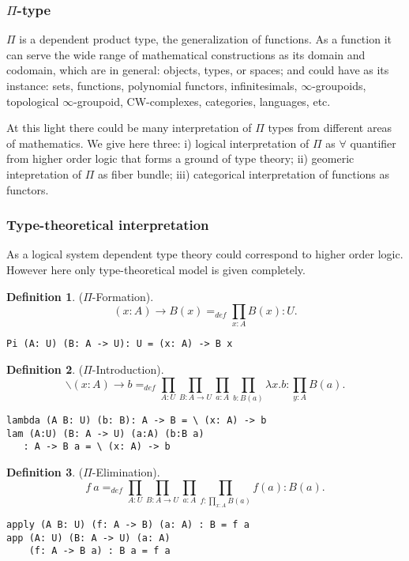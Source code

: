 \documentclass{article}
\theoremstyle{definition}
\newtheorem{definition}{Definition}
\begin{document}
\subsubsection{$\Pi$-type}

$\Pi$ is a dependent product type, the generalization of functions.
As a function it can serve the wide range of mathematical constructions as its domain and codomain,
which are in general: objects, types, or spaces; and could have as its
instance: sets, functions, polynomial functors, infinitesimals, $\infty$-groupoids,
topological $\infty$-groupoid, CW-complexes,
categories, languages, etc.

At this light there could be many interpretation of $\Pi$ types from different
areas of mathematics. We give here three: i) logical interpretation of $\Pi$ as
$\forall$ quantifier from higher order logic
that forms a ground of type theory; ii) geomeric intepretation of $\Pi$ as fiber bundle;
iii) categorical interpretation of functions as functors.

\subsubsection*{Type-theoretical interpretation}

As a logical system dependent type theory could correspond to higher order logic.
However here only type-theoretical model is given completely.

\begin{definition} ($\Pi$-Formation).
$$(x: A) \rightarrow B(x) =_{def} \prod_{x:A}B(x) : U.$$
\begin{lstlisting}
Pi (A: U) (B: A -> U): U = (x: A) -> B x
\end{lstlisting}
\end{definition}

\begin{definition} ($\Pi$-Introduction).
$$\backslash (x: A) \rightarrow b =_{def} \prod_{A:U}\prod_{B:A \rightarrow U}\prod_{a: A}\prod_{b:B(a)}\lambda x.b : \prod_{y:A}B(a).$$
\begin{lstlisting}
lambda (A B: U) (b: B): A -> B = \ (x: A) -> b
lam (A:U) (B: A -> U) (a:A) (b:B a)
   : A -> B a = \ (x: A) -> b
\end{lstlisting}
\end{definition}

\begin{definition} ($\Pi$-Elimination).
$$f\ a =_{def} \prod_{A:U}\prod_{B: A \rightarrow U}\prod_{a:A}\prod_{f: \prod_{x:A}B(a)}f(a) : B(a).$$
\begin{lstlisting}
apply (A B: U) (f: A -> B) (a: A) : B = f a
app (A: U) (B: A -> U) (a: A)
    (f: A -> B a) : B a = f a
\end{lstlisting}
\end{definition}
\end{document}
